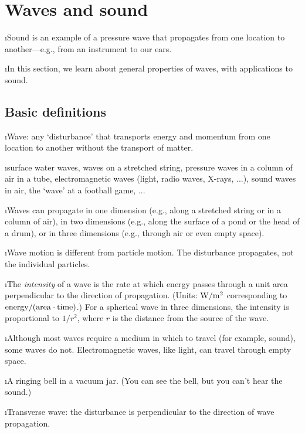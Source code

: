 \section{Waves and sound}
\label{s:waves}

\bi
\i Sound is an example of a pressure wave that propagates 
from one location to another---e.g., from an instrument to 
our ears.

\i In this section, we learn about general properties of 
waves, with applications to sound.

\ei

\subsection{Basic definitions}

\bi
\i Wave: any `disturbance' that transports energy
and momentum from one location to another without
the transport of matter.

\i \ex surface water waves, waves on a stretched string, 
pressure waves in a column of air in a tube,
electromagnetic waves (light, radio waves, X-rays, ...), 
sound waves in air, 
the `wave' at a football game, ...

\i Waves can propagate 
in one dimension (e.g., along a stretched string or in a column of air), 
in two dimensions (e.g., along the surface of a pond or
the head of a drum), or 
in three dimensions (e.g., through air or even empty space).

\i Wave motion is different from particle motion.
The disturbance propagates, not the individual particles.

\i The {\em intensity} of a wave is the rate at which energy
passes through a unit area perpendicular to the direction
of propagation.
(Units: ${\rm W}/{\rm m}^2$ corresponding to 
${\rm energy}/({\rm area}\cdot{\rm time})$.)
For a spherical wave in three dimensions, the intensity is
proportional to $1/r^2$, where $r$ is the distance from the
source of the wave.

\i Although most waves require a medium in which to travel
(for example, sound), some waves do not.
Electromagnetic waves, like light, can travel through empty
space.

\i \ex A ringing bell in a vacuum jar.
(You can see the bell, but you can't hear the sound.)

\i Transverse wave: 
the disturbance is perpendicular to the direction of 
wave propagation.

